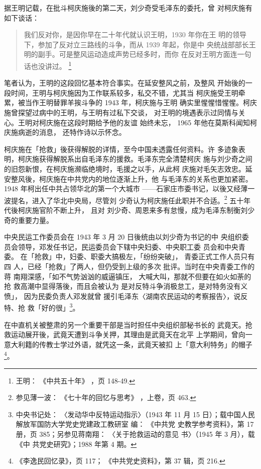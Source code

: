 据王明记载，在批斗柯庆施後的第二天，刘少奇受毛泽东的委托，曾
对柯庆施有如下谈话：
\begin{quote}
	\fzwkai 我们反对你，是因你早在二十年代就认识王明，1930 年你在王
明的领导下，参加了反对立三路线的斗争，而从 1939 年起，你是中
央统战部部长王明的副手。可是整风运动造成声势已经多时，而你
在反对王明方面连一句话也没讲过。
\footnote{王明：
《中共五十年》
，页 148-49.}
\end{quote}

笔者认为，王明的这段回忆基本符合事实。在延安整风之前，及整风
开始後的一段时间，王明与柯庆施因为工作联系较多，私交不错，尤其当
柯庆施受王明牵累，被当作王明替罪羊挨斗争的 1943 年，柯庆施与王明
确实里惺惺惜惺惺。柯庆施曾探望过病中的王明，与王明有过私下交谈，
对王明的境遇表示过同情与关心。王明对柯庆施在这段时期给予他的友谊
始终未忘，
1965 年他在莫斯科闻知柯庆施病逝的消息，
还特作诗以示怀念。

柯庆施在「抢救」後获得解脱的详情，至今中国未透露任何资料。许
多迹象表明，柯庆施获得解脱系出自毛泽东的援救。毛泽东完全清楚柯庆
施与刘少奇之间的旧怨新恨，在柯庆施濒临绝境时，毛援之以手，从此柯
庆施对毛矢志效忠。延安整风後，柯庆施在中共党内的地位逐渐上升，他
与毛泽东的关系也更加紧密。
1948 年柯出任中共占领华北的第一个大城市
——石家庄市委书记，以後又经薄一波提名，进入了华北中央局，尽管刘
少奇认为柯庆施任此职并不合适。\footnote{参见薄一波：
《七十年的回忆与思考》
，上卷，页 463.} 五十年代後柯庆施官阶不断上升，
且对
刘少奇、周恩来多有怠慢，成为毛泽东制衡刘少奇的重要力量。

中央民运工作委员会在 1943 年 3 月 20 日後统由以刘少奇为书记的中 央组织委
员会领导，邓发任书记，民运委员会下辖中央妇委、中央职工委 员会和中央青委。
在「抢救」中，妇委、职委大搞极左，「纷纷突破」， 青委正式工作人员只有四
人，已经「抢救」了两人，但仍受到上级的多次 批评。当时在中央青委工作的蒋
南翔深感，「如不气势汹汹的威逼镇压， 大喊大叫，那就不但要在如火如荼的抢
救高潮中显得落後，而且会被认为 是对反特斗争消极怠工，是对特务没有义愤」，
因为民委负责人邓发就曾 援引毛泽东〈湖南农民运动的考察报告〉，说反特、抢
救「好的很」\footnote{中央书记处： 〈发动华中反特运动指示〉（1943 年
11 月 15 日）；载中国人民解放军国防大学党史党建政工教研室 编： 《中共党
史教学参考资料》，第 17 册，页 385；另参见蒋南翔： 〈关于抢救运动的意见
书〉（1945 年 3 月），载《中 共党史研究》；1988 年第 4 期。}。

在中直机关被整肃的另一个重要干部是当时担任中央组织部秘书长的 武竟天。抢
救运动展开後，武竟天遭到斗争关押，其理由是武竟天在北平 上学期间，曾向一
意大利籍的传教士学过外语，就凭这一条，武竟天被扣 上「意大利特务」的帽子
\footnote{《李逸民回忆录》，页 117； 《中共党史资料》，第 37 辑，页
216.}。

